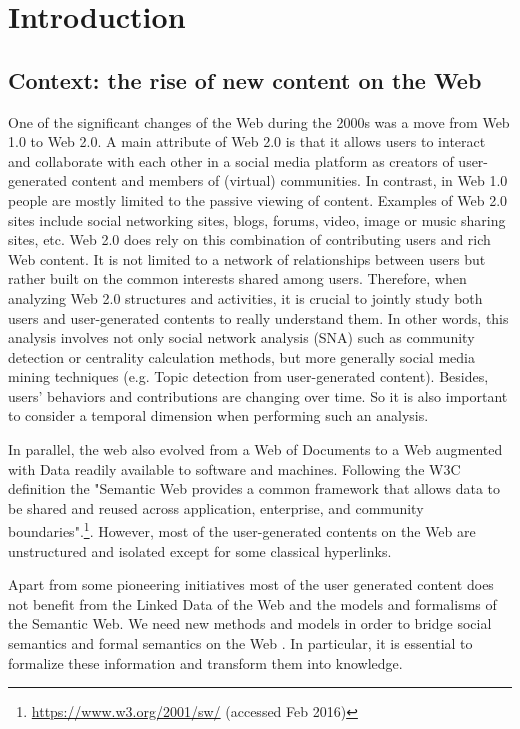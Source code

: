 
\chapter{Introduction}
\doublespacing
\label{chap:intro}
\minitoc
\section{Context: the rise of new content on the Web}

One of the significant changes of the Web during the 2000s was a move from Web 1.0 to Web 2.0. A main attribute of Web 2.0 is that it allows users to interact and collaborate with each other in a social media platform as creators of user-generated content \cite{moens2014mining} and members of (virtual) communities. In contrast, in Web 1.0 people are mostly limited to the passive viewing of content. Examples of Web 2.0 sites include social networking sites, blogs, forums, video, image or music sharing sites, etc. Web 2.0 does rely on this combination of contributing users and rich Web content. It is not limited to a network of relationships between users but rather built on the common interests shared among users. Therefore, when analyzing Web 2.0 structures and activities, it is crucial to jointly study both users and user-generated contents to really understand them. In other words, this analysis involves not only social network analysis (SNA) such as community detection or centrality calculation methods, but more generally social media mining techniques (e.g. Topic detection from user-generated content). Besides, users' behaviors and contributions are changing over time. So it is also important to consider a temporal dimension when performing such an analysis.


In parallel, the web also evolved from a Web of Documents to a Web augmented with Data readily available to software and machines. Following the W3C definition the "Semantic Web provides a common framework that allows data to be shared and reused across application, enterprise, and community boundaries".\footnote{\url{https://www.w3.org/2001/sw/} (accessed Feb 2016)}. However, most of the user-generated contents on the Web are unstructured and isolated except for some classical hyperlinks.


Apart from some pioneering initiatives \cite{chp1DBLP:journals/ijwbc/BreslinDHB06} \cite{chp1DBLP:journals/internet/BreslinD07} \cite{chp1DBLP:conf/webi/Mika04} \cite{chp1DBLP:conf/semweb/EreteoBGC09}  most of the user generated content does not benefit from the Linked Data of the Web and the models and formalisms of the Semantic Web. We need new methods and models in order to bridge social semantics and formal semantics on the Web \cite{gandon:hal-01059273}. In particular, it is essential to formalize these information and transform them into knowledge. 

